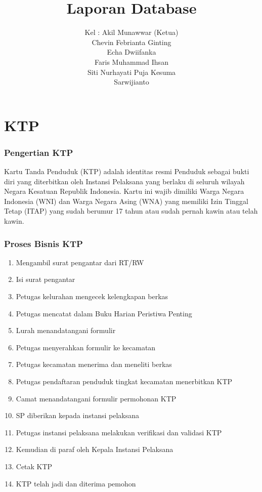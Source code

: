 \documentclass{article}
\begin{document}
\title{Laporan Database}
\author{Kel : Akil Munawwar (Ketua)\\Chevin Febrianta Ginting\\Echa Dwiifanka\\Faris Muhammad Ihsan\\Siti Nurhayati Puja Kesuma\\Sarwijianto}
\maketitle

\part{KTP}
\section{Pengertian KTP}
Kartu Tanda Penduduk (KTP) adalah identitas resmi Penduduk sebagai bukti diri yang diterbitkan oleh Instansi Pelaksana yang berlaku di seluruh wilayah Negara Kesatuan Republik Indonesia. Kartu ini wajib dimiliki Warga Negara Indonesia (WNI) dan Warga Negara Asing (WNA) yang memiliki Izin Tinggal Tetap (ITAP) yang sudah berumur 17 tahun atau sudah pernah kawin atau telah kawin.
\section{Proses Bisnis KTP}
\begin{enumerate}
\item Mengambil surat pengantar dari RT/RW
\item Isi surat pengantar
\item Petugas kelurahan mengecek kelengkapan berkas
\item Petugas mencatat dalam Buku Harian Peristiwa Penting
\item Lurah menandatangani formulir
\item Petugas menyerahkan formulir ke kecamatan
\item Petugas kecamatan menerima dan meneliti berkas
\item Petugas pendaftaran penduduk tingkat kecamatan menerbitkan KTP
\item Camat menandatangani formulir permohonan KTP
\item SP diberikan kepada instansi pelaksana
\item Petugas instansi pelaksana melakukan verifikasi dan validasi KTP
\item Kemudian di paraf oleh Kepala Instansi Pelaksana
\item Cetak KTP
\item KTP telah jadi dan diterima pemohon
\end{enumerate}
\end{document}
